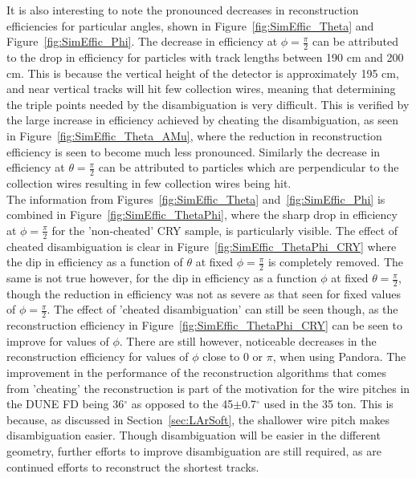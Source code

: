 It is also interesting to note the pronounced decreases in reconstruction efficiencies for particular angles, shown in Figure~\ref{fig:SimEffic_Theta} and Figure~\ref{fig:SimEffic_Phi}. The decrease in efficiency at $\phi = \frac{\pi}{2}$ can be attributed to the drop in efficiency for particles with track lengths between 190 cm and 200 cm. This is because the vertical height of the detector is approximately 195 cm, and near vertical tracks will hit few collection wires, meaning that determining the triple points needed by the disambiguation is very difficult. This is verified by the large increase in efficiency achieved by cheating the disambiguation, as seen in Figure~\ref{fig:SimEffic_Theta_AMu}, where the reduction in reconstruction efficiency is seen to become much less pronounced. Similarly the decrease in efficiency at $\theta = \frac{\pi}{2}$ can be attributed to particles which are perpendicular to the collection wires resulting in few collection wires being hit. \\  

The information from Figures~\ref{fig:SimEffic_Theta} and~\ref{fig:SimEffic_Phi} is combined in Figure~\ref{fig:SimEffic_ThetaPhi}, where the sharp drop in efficiency at $\phi = \frac{\pi}{2}$ for the 'non-cheated' CRY sample, is particularly visible. The effect of cheated disambiguation is clear in Figure~\ref{fig:SimEffic_ThetaPhi_CRY} where the dip in efficiency as a function of $\theta$ at fixed $\phi=\frac{\pi}{2}$ is completely removed. The same is not true however, for the dip in efficiency as a function $\phi$ at fixed $\theta = \frac{\pi}{2}$, though the reduction in efficiency was not as severe as that seen for fixed values of $\phi = \frac{\pi}{2}$. The effect of 'cheated disambiguation' can still be seen though, as the reconstruction efficiency in Figure~\ref{fig:SimEffic_ThetaPhi_CRY} can be seen to improve for values of $\phi$. There are still however, noticeable decreases in the reconstruction efficiency for values of $\phi$ close to 0 or $\pi$, when using Pandora. The improvement in the performance of the reconstruction algorithms that comes from 'cheating' the reconstruction is part of the motivation for the wire pitches in the DUNE FD being 36$^{\circ}$ as opposed to the 45$\pm$0.7$^{\circ}$ used in the 35 ton. This is because, as discussed in Section~\ref{sec:LArSoft}, the shallower wire pitch makes disambiguation easier. Though disambiguation will be easier in the different geometry, further efforts to improve disambiguation are still required, as are continued efforts to reconstruct the shortest tracks. \\


